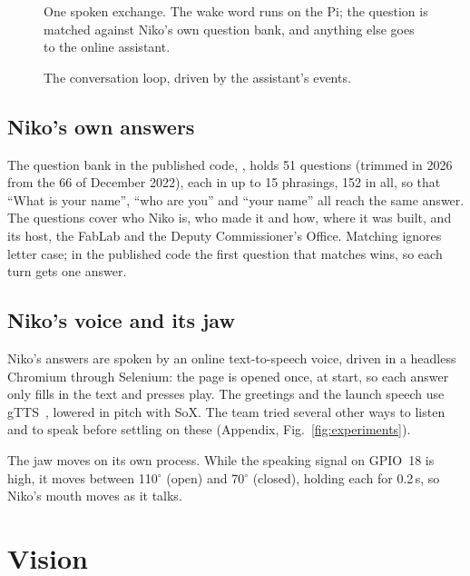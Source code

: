 \documentclass[11pt]{article}
\begin{document}
\begin{figure}[htbp]
  \centering
  \caption{One spoken exchange. The wake word runs on the Pi; the question is matched against Niko's own question bank, and anything else goes to the online assistant.}
  \label{fig:voice}
\end{figure}

\begin{figure}[htbp]
  \centering
  \caption{The conversation loop, driven by the assistant's events.}
  \label{fig:states}
\end{figure}

\subsection{Niko's own answers}

The question bank in the published code, , holds 51 questions (trimmed in 2026 from the 66 of December 2022), each in up to 15 phrasings, 152 in all, so that ``What is your name'', ``who are you'' and ``your name'' all reach the same answer. The questions cover who Niko is, who made it and how, where it was built, and its host, the FabLab and the Deputy Commissioner's Office. Matching ignores letter case; in the published code the first question that matches wins, so each turn gets one answer.

\subsection{Niko's voice and its jaw}

Niko's answers are spoken by an online text-to-speech voice, driven in a headless Chromium through Selenium: the page is opened once, at start, so each answer only fills in the text and presses play. The greetings and the launch speech use gTTS~\cite{gtts}, lowered in pitch with SoX. The team tried several other ways to listen and to speak before settling on these (Appendix, Fig.~\ref{fig:experiments}).

The jaw moves on its own process. While the speaking signal on GPIO~18 is high, it moves between 110$^\circ$ (open) and 70$^\circ$ (closed), holding each for 0.2\,s, so Niko's mouth moves as it talks.

\section{Vision}
\label{sec:vision}
\end{document}
